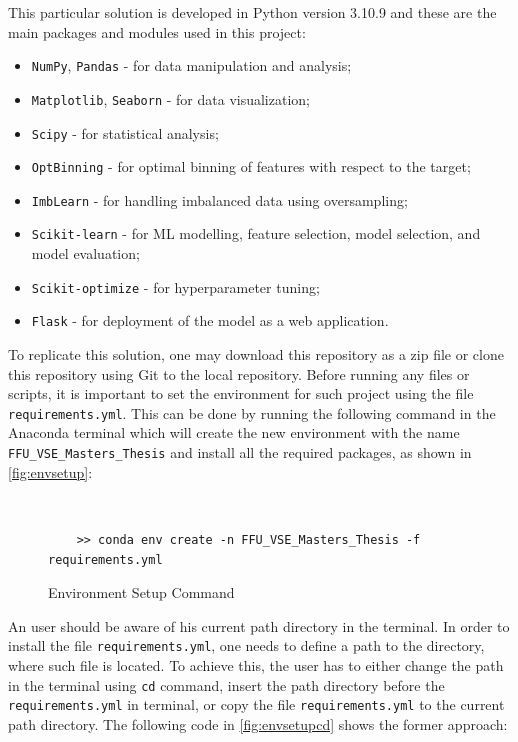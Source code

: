 This particular solution is developed in Python version 3.10.9 and these are the main packages and modules used in this project:
\begin{itemize}\setlength\itemsep{0em}
\item \lstinline{NumPy}, \lstinline{Pandas} - for data manipulation and analysis;
\item \lstinline{Matplotlib}, \lstinline{Seaborn} - for data visualization;
\item \lstinline{Scipy} - for statistical analysis;
\item \lstinline{OptBinning} - for optimal binning of features with respect to the target;
\item \lstinline{ImbLearn} - for handling imbalanced data using oversampling;
\item \lstinline{Scikit-learn} - for ML modelling, feature selection, model selection, and model evaluation;
\item \lstinline{Scikit-optimize} - for hyperparameter tuning;
\item \lstinline{Flask} - for deployment of the model as a web application.
\end{itemize}
\newpage
To replicate this solution, one may download this repository as a zip file or clone this repository using Git to the local repository. Before running any files or scripts, it is important to set the environment for such project using the file \texttt{requirements.yml}.
This can be done by running the following command in the Anaconda terminal which will create the new environment with the name \texttt{FFU\_VSE\_Masters\_Thesis} and install all the required packages, as shown in \autoref{fig:envsetup}:
\begin{figure}[H]
    \centering\caption{Environment Setup Command}
    \label{fig:envsetup}
\centering\
{\footnotesize
\begin{verbatim}
    >> conda env create -n FFU_VSE_Masters_Thesis -f requirements.yml    
\end{verbatim}
}
\vspace{0em}
\end{figure}
An user should be aware of his current path directory in the terminal. In order to install the file \texttt{requirements.yml}, one needs to define a path to the directory, where such file is located.
To achieve this, the user has to either change the path in the terminal using \texttt{cd} command, insert the path directory before the \texttt{requirements.yml} in terminal, or copy the file \texttt{requirements.yml} to the current path directory. The following code in \autoref{fig:envsetupcd} shows the former approach:
